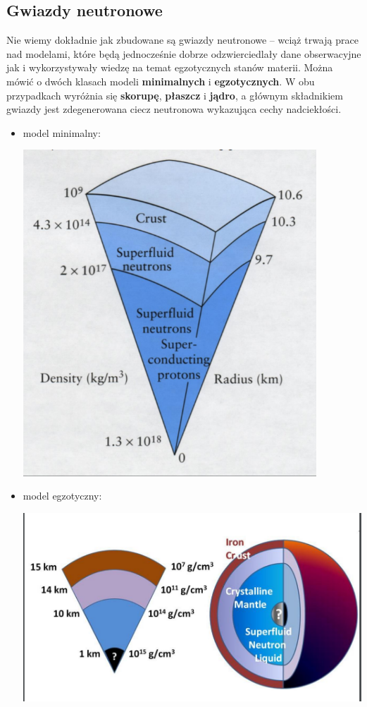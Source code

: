 \documentclass[../index.tex]{subfiles}
\begin{document}
        \subsection{Gwiazdy neutronowe}
            Nie wiemy dokładnie jak zbudowane są gwiazdy neutronowe – wciąż trwają prace nad modelami, które będą jednocześnie dobrze odzwierciedlały dane obserwacyjne jak i wykorzystywały wiedzę na temat egzotycznych stanów materii. Można mówić o dwóch klasach modeli \textbf{minimalnych} i \textbf{egzotycznych}. W obu przypadkach wyróżnia się \textbf{skorupę}, \textbf{płaszcz} i \textbf{jądro}, a głównym składnikiem gwiazdy jest zdegenerowana ciecz neutronowa wykazująca cechy nadciekłości.
            \begin{itemize}
                \item model minimalny:
                \begin{center}
                    \includegraphics[width=11cm]{images/gwiazdaNeutronowaModelMinimalny.png}
                \end{center}
                \item model egzotyczny:
                \begin{center}
                    \includegraphics[width=15cm]{images/gwiazdaNeutronowaModelEgzotyczny.png}
                \end{center}
            \end{itemize}
\end{document}
